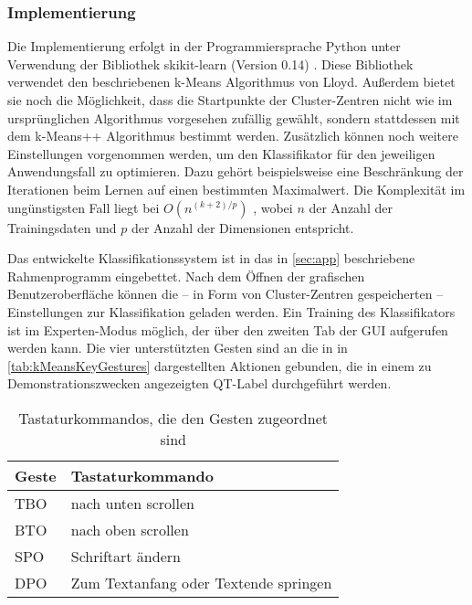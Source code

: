 \subsubsection{Implementierung} \label{subsubsec:kMeansImpl}
Die Implementierung erfolgt in der Programmiersprache Python unter Verwendung der Bibliothek skikit-learn (Version 0.14) \cite{sklearn}. Diese Bibliothek verwendet den beschriebenen k-Means Algorithmus von Lloyd. Außerdem bietet sie noch die Möglichkeit, dass die Startpunkte der Cluster-Zentren nicht wie im ursprünglichen Algorithmus vorgesehen zufällig gewählt, sondern stattdessen mit dem k-Means++ Algorithmus bestimmt werden. Zusätzlich können noch weitere 
Einstellungen vorgenommen werden, um den Klassifikator für den jeweiligen Anwendungsfall  zu optimieren. Dazu gehört beispielsweise eine Beschränkung der Iterationen beim Lernen auf einen bestimmten Maximalwert.
Die Komplexität im ungünstigsten Fall liegt bei $O(n^{(k+2)/p})$ \cite{sklearn.kmeans, kMeansHowSlow}, wobei $n$ der Anzahl der Trainingsdaten und $p$ der Anzahl der Dimensionen entspricht.

Das entwickelte Klassifikationssystem ist in das in \autoref{sec:app} beschriebene Rahmenprogramm eingebettet. Nach dem Öffnen der grafischen Benutzeroberfläche können die -- in Form von Cluster-Zentren gespeicherten --  Einstellungen zur Klassifikation geladen werden. Ein Training des Klassifikators ist im Experten-Modus möglich, der über den zweiten Tab der GUI aufgerufen werden kann. Die vier unterstützten Gesten sind an die in in \autoref{tab:kMeansKeyGestures} dargestellten Aktionen gebunden, die in einem zu Demonstrationszwecken angezeigten QT-Label durchgeführt werden.

\begin{table}[h]
\centering
\begin{tabular}{|p{}|p{}|}
\hline
 \textbf{Geste} & \textbf{Tastaturkommando} \\
 \hline
  \ac{TBO} & nach unten scrollen \\
 \hline
  BTO & nach oben scrollen \\
 \hline
  \ac{SPO} & Schriftart ändern \\
 \hline
  \ac{DPO} & Zum Textanfang oder Textende springen \\
 \hline
\end{tabular}
\caption[Tastaturkommandos, die den Gesten zugeordnet sind]{Tastaturkommandos, die den Gesten zugeordnet sind}
\label{tab:kMeansKeyGestures}
\end{table}



